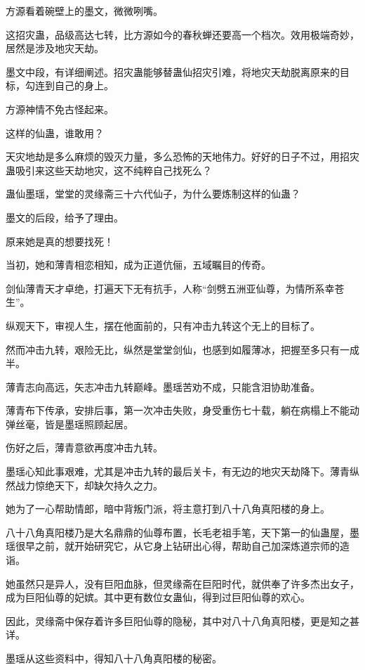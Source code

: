 
\begin{this_body}

方源看着碗壁上的墨文，微微咧嘴。

这招灾蛊，品级高达七转，比方源如今的春秋蝉还要高一个档次。效用极端奇妙，居然是涉及地灾天劫。

墨文中段，有详细阐述。招灾蛊能够替蛊仙招灾引难，将地灾天劫脱离原来的目标，勾连到自己的身上。

方源神情不免古怪起来。

这样的仙蛊，谁敢用？

天灾地劫是多么麻烦的毁灭力量，多么恐怖的天地伟力。好好的日子不过，用招灾蛊吸引来这些天劫地灾，这不纯粹自己找死么？

蛊仙墨瑶，堂堂的灵缘斋三十六代仙子，为什么要炼制这样的仙蛊？

墨文的后段，给予了理由。

原来她是真的想要找死！

当初，她和薄青相恋相知，成为正道伉俪，五域瞩目的传奇。

剑仙薄青天才卓绝，打遍天下无有抗手，人称“剑劈五洲亚仙尊，为情所系幸苍生”。

纵观天下，审视人生，摆在他面前的，只有冲击九转这个无上的目标了。

然而冲击九转，艰险无比，纵然是堂堂剑仙，也感到如履薄冰，把握至多只有一成半。

薄青志向高远，矢志冲击九转巅峰。墨瑶苦劝不成，只能含泪协助准备。

薄青布下传承，安排后事，第一次冲击失败，身受重伤七十载，躺在病榻上不能动弹丝毫，皆是墨瑶照顾起居。

伤好之后，薄青意欲再度冲击九转。

墨瑶心知此事艰难，尤其是冲击九转的最后关卡，有无边的地灾天劫降下。薄青纵然战力惊绝天下，却缺欠持久之力。

她为了一心帮助情郎，暗中背叛门派，将主意打到八十八角真阳楼的身上。

八十八角真阳楼乃是大名鼎鼎的仙尊布置，长毛老祖手笔，天下第一的仙蛊屋，墨瑶很早之前，就开始研究它，从它身上钻研出心得，帮助自己加深炼道宗师的造诣。

她虽然只是异人，没有巨阳血脉，但灵缘斋在巨阳时代，就供奉了许多杰出女子，成为巨阳仙尊的妃嫔。其中更有数位女蛊仙，得到过巨阳仙尊的欢心。

因此，灵缘斋中保存着许多巨阳仙尊的隐秘，其中对八十八角真阳楼，更是知之甚详。

墨瑶从这些资料中，得知八十八角真阳楼的秘密。


\end{this_body}
